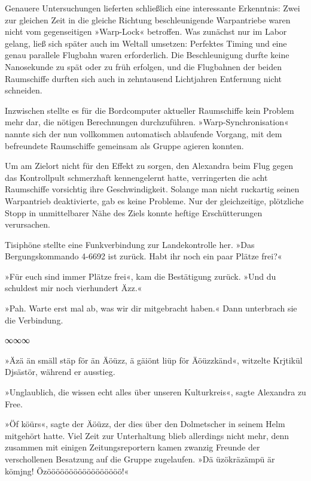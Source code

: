 Genauere Untersuchungen lieferten schließlich eine interessante Erkenntnis: Zwei zur gleichen Zeit in die gleiche Richtung beschleunigende Warpantriebe waren nicht vom gegenseitigen »Warp-Lock« betroffen. Was zunächst nur im Labor gelang, ließ sich später auch im Weltall umsetzen: Perfektes Timing und eine genau parallele Flugbahn waren erforderlich. Die Beschleunigung durfte keine Nanosekunde zu spät oder zu früh erfolgen, und die Flugbahnen der beiden Raumschiffe durften sich auch in zehntausend Lichtjahren Entfernung nicht schneiden.

Inzwischen stellte es für die Bordcomputer aktueller Raumschiffe kein Problem mehr dar, die nötigen Berechnungen durchzuführen. »Warp-Synchronisation« nannte sich der nun vollkommen automatisch ablaufende Vorgang, mit dem befreundete Raumschiffe gemeinsam als Gruppe agieren konnten.

Um am Zielort nicht für den Effekt zu sorgen, den Alexandra beim Flug gegen das Kontrollpult schmerzhaft kennengelernt hatte, verringerten die acht Raumschiffe vorsichtig ihre Geschwindigkeit. Solange man nicht ruckartig seinen Warpantrieb deaktivierte, gab es keine Probleme. Nur der gleichzeitige, plötzliche Stopp in unmittelbarer Nähe des Ziels konnte heftige Erschütterungen verursachen.

Tisiphöne stellte eine Funkverbindung zur Landekontrolle her. »Das Bergungskommando 4-6692 ist zurück. Habt ihr noch ein paar Plätze frei?«

»Für euch sind immer Plätze frei«, kam die Bestätigung zurück. »Und du schuldest mir noch vierhundert Äzz.«

»Pah. Warte erst mal ab, was wir dir mitgebracht haben.« Dann unterbrach sie die Verbindung.

\begin{center}
    ∞∞∞
\end{center}

»Äzä än smäll stäp för än Äöüzz, ä gäiönt liüp för Äöüzzkänd«, witzelte Krjtikül Djsästör, während er ausstieg.

»Unglaublich, die wissen echt alles über unseren Kulturkreis«, sagte Alexandra zu Free.

»Öf köürs«, sagte der Äöüzz, der dies über den Dolmetscher in seinem Helm mitgehört hatte. Viel Zeit zur Unterhaltung blieb allerdings nicht mehr, denn zusammen mit einigen Zeitungsreportern kamen zwanzig Freunde der verschollenen Besatzung auf die Gruppe zugelaufen. »Dä üzökräzämpü är kömjng! Özööööööööööööööööö!«

